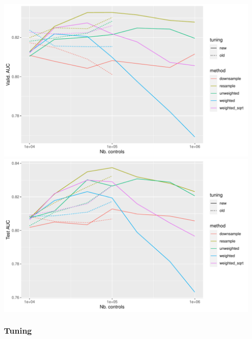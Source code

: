 \documentclass[12pt]{article}
\begin{document}
\begin{center}
\includegraphics[width=.9\textwidth]{best_aucs_large_valid.pdf}
\includegraphics[width=.9\textwidth]{best_aucs_large_test.pdf}
\end{center}

\pagebreak
\subsubsection*{Tuning}
\end{document}

